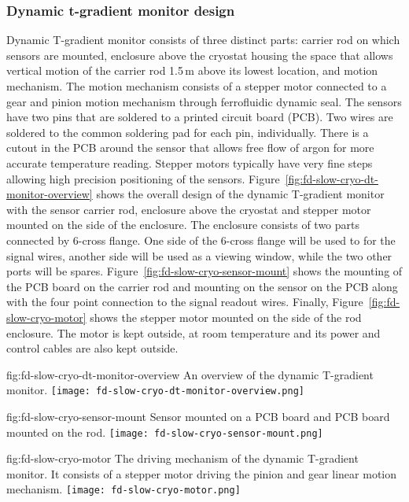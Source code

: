 \subsubsection{Dynamic t-gradient monitor design}
Dynamic T-gradient monitor consists of three distinct parts: carrier rod on which sensors are mounted, enclosure above the cryostat housing the space that allows vertical motion of the carrier rod 1.5\,m above its lowest location, and motion mechanism. The motion mechanism consists of a stepper motor connected to a gear and pinion motion mechanism through ferrofluidic dynamic seal. The sensors have two pins that are soldered to a printed circuit board (PCB). Two wires are soldered to the common soldering pad for each pin, individually.   There is a cutout in the PCB around the sensor that allows free flow of argon for more accurate temperature reading.  Stepper motors typically have very fine steps allowing high precision positioning of the sensors.  Figure~\ref{fig:fd-slow-cryo-dt-monitor-overview} shows the overall design of the dynamic T-gradient monitor with the sensor carrier rod, enclosure above the cryostat and stepper motor mounted on the side of the enclosure. The enclosure consists of two parts connected by 6-cross flange. One side of the 6-cross flange will be used to for the signal wires, another side will be used as a viewing window, while the two other ports will be spares. Figure~\ref{fig:fd-slow-cryo-sensor-mount} shows the mounting of the PCB board on the carrier rod and mounting on the sensor on the PCB along with the four point connection to the signal readout wires. Finally, Figure~\ref{fig:fd-slow-cryo-motor} shows the stepper motor mounted on the side of the rod enclosure. The motor is kept outside, at room temperature and its power and control cables are also kept outside.

\begin{dunefigure}{fig:fd-slow-cryo-dt-monitor-overview}
  {An overview of the dynamic T-gradient monitor.}
 \texttt{[image: fd-slow-cryo-dt-monitor-overview.png]}
\end{dunefigure}
\begin{dunefigure}[]{fig:fd-slow-cryo-sensor-mount}
  {Sensor mounted on a PCB board and PCB board mounted on the rod. }
  \texttt{[image: fd-slow-cryo-sensor-mount.png]}
\end{dunefigure}
\begin{dunefigure}[]{fig:fd-slow-cryo-motor}
  {The driving mechanism of the dynamic T-gradient monitor. It consists of a stepper motor driving the pinion and gear linear motion mechanism. }
  \texttt{[image: fd-slow-cryo-motor.png]}
\end{dunefigure}

